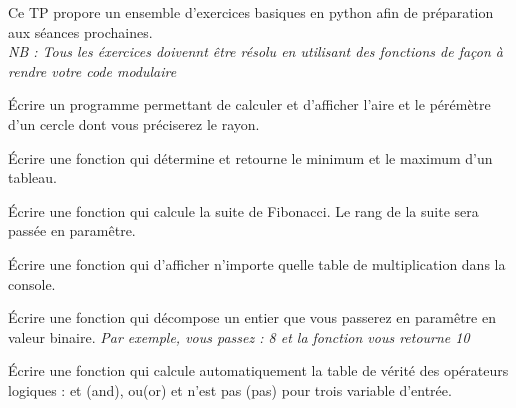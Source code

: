 \documentclass[12pt]{tdtp}
\begin{document}
\titre
Ce TP propore un ensemble d'exercices basiques en python afin de préparation aux séances prochaines.\\
\textit{NB : Tous les éxercices doivennt être résolu en utilisant des fonctions de façon à rendre votre code modulaire }

\Exo

Écrire un programme permettant de calculer et d'afficher l'aire et le pérémètre d'un cercle dont vous préciserez le rayon.


\Exo


Écrire une fonction qui détermine et retourne le minimum et le maximum d'un tableau.


\Exo 

Écrire une fonction qui calcule la suite de Fibonacci. Le rang de la suite sera passée en paramêtre.


\Exo


Écrire une fonction qui d'afficher n'importe quelle table de multiplication dans la console.

\Exo

Écrire une fonction qui décompose un entier que vous passerez en paramêtre en valeur binaire. \textit{Par exemple, vous passez : 8 et la fonction vous retourne 10}


\Exo

Écrire une fonction qui calcule automatiquement la table de vérité des opérateurs logiques : et  (and), ou(or) et n'est pas (pas) pour trois variable d'entrée.
\end{document}

